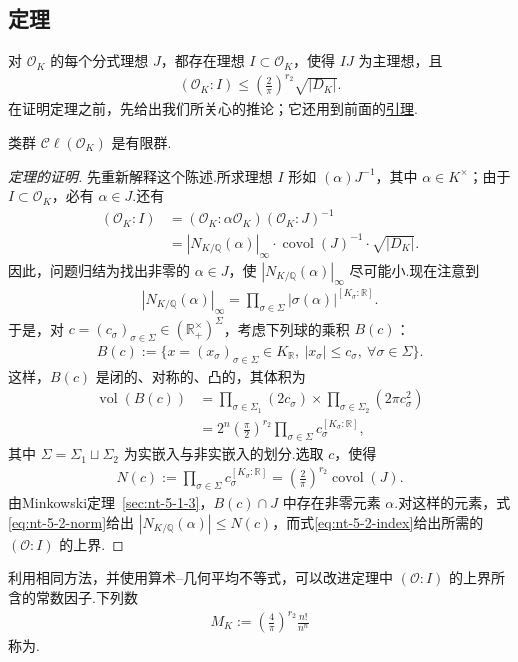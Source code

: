 \subsection{定理}\label{sec:nt-5-2-2}
对 $\mathcal O_K$ 的每个分式理想 $J$，都存在理想 $I\subset\mathcal O_K$，使得 $IJ$ 为主理想，且
\begin{align*}
(\mathcal O_K:I)\le\left(\frac2\pi\right)^{r_2}\sqrt{|D_K|}.
\end{align*}
在证明定理之前，先给出我们所关心的推论；它还用到前面的\hyperref[lem:nt-5-2-bounded-index]{引理}.
\begin{corollary*}\label{cor:nt-5-2-class-finite}
类群 $\mathcal C\ell(\mathcal O_K)$ 是有限群.
\end{corollary*}
\begin{proof}[定理的证明]
先重新解释这个陈述.所求理想 $I$ 形如 $(\alpha)J^{-1}$，其中 $\alpha\in K^\times$；由于 $I\subset\mathcal O_K$，必有 $\alpha\in J$.还有
\begin{align*}
(\mathcal O_K:I)&=(\mathcal O_K:\alpha\mathcal O_K)(\mathcal O_K:J)^{-1}\\
&=|N_{K/\mathbb Q}(\alpha)|_\infty\cdot\operatorname{covol}(J)^{-1}\cdot\sqrt{|D_K|}.\tag{$\dagger$}\label{eq:nt-5-2-index}
\end{align*}
因此，问题归结为找出非零的 $\alpha\in J$，使 $|N_{K/\mathbb Q}(\alpha)|_\infty$ 尽可能小.现在注意到
\begin{align*}
|N_{K/\mathbb Q}(\alpha)|_\infty=\prod_{\sigma\in\Sigma}|\sigma(\alpha)|^{[K_\sigma:\mathbb R]}.\tag{$\dagger\dagger$}\label{eq:nt-5-2-norm}
\end{align*}
于是，对 $c=(c_\sigma)_{\sigma\in\Sigma}\in(\mathbb R_+^\times)^\Sigma$，考虑下列球的乘积 $B(c)$：
\begin{align*}
B(c):=\{x=(x_\sigma)_{\sigma\in\Sigma}\in K_{\mathbb R},\ |x_\sigma|\le c_\sigma,\ \forall\sigma\in\Sigma\}.
\end{align*}
这样，$B(c)$ 是闭的、对称的、凸的，其体积为
\begin{align*}
\operatorname{vol}(B(c))&=\prod_{\sigma\in\Sigma_1}(2c_\sigma)\times\prod_{\sigma\in\Sigma_2}(2\pi c_\sigma^2)\\
&=2^n\left(\frac\pi2\right)^{r_2}\prod_{\sigma\in\Sigma}c_\sigma^{[K_\sigma:\mathbb R]},
\end{align*}
其中 $\Sigma=\Sigma_1\sqcup\Sigma_2$ 为实嵌入与非实嵌入的划分.选取 $c$，使得
\begin{align*}
N(c):=\prod_{\sigma\in\Sigma}c_\sigma^{[K_\sigma:\mathbb R]}=\left(\frac2\pi\right)^{r_2}\operatorname{covol}(J). 
\end{align*}
由Minkowski定理~\ref{sec:nt-5-1-3}，$B(c)\cap J$ 中存在非零元素 $\alpha$.对这样的元素，式\eqref{eq:nt-5-2-norm}给出 $|N_{K/\mathbb Q}(\alpha)|\le N(c)$，而式\eqref{eq:nt-5-2-index}给出所需的 $(\mathcal O:I)$ 的上界.
\end{proof}
利用相同方法，并使用算术--几何平均不等式，可以改进定理中 $(\mathcal O:I)$ 的上界所含的常数因子.下列数
\begin{align*}
M_K:=\left(\frac4\pi\right)^{r_2}\frac{n!}{n^n}
\end{align*}
称为.
